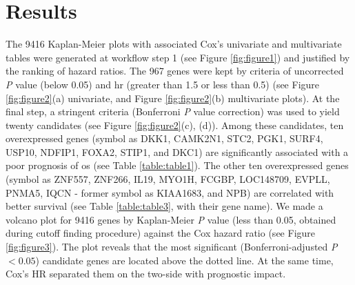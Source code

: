 \documentclass[jpm,article,submit,moreauthors,pdftex]{Definitions/mdpi}
\begin{document}
\clearpage

\section{Results}


The 9416 Kaplan-Meier plots with associated Cox's univariate and multivariate tables were generated at workflow step 1 (see Figure \ref{fig:figure1}) and justified by the ranking of hazard ratios.
The 967 genes were kept by criteria of uncorrected \textit{P} value (below 0.05) and \acrfull{hr} (greater than 1.5 or less than 0.5) (see Figure \ref{fig:figure2}(a) univariate, and Figure \ref{fig:figure2}(b) multivariate plots). 
At the final step, a stringent criteria (Bonferroni \textit{P} value correction) was used to yield twenty candidates (see Figure \ref{fig:figure2}(c), (d)). 
Among these candidates, ten overexpressed genes (symbol as DKK1, CAMK2N1, STC2, PGK1, SURF4, USP10, NDFIP1, FOXA2, STIP1, and DKC1) are significantly associated with a poor prognosis of  \acrshort{os} (see Table \ref{table:table1}). 
The other ten overexpressed genes (symbol as ZNF557, ZNF266, IL19, MYO1H, FCGBP, LOC148709, EVPLL, PNMA5, IQCN - former symbol as KIAA1683, and NPB) are correlated with better survival (see Table \ref{table:table3}, with their gene name).
We made a volcano plot for 9416 genes by Kaplan-Meier \textit{P} value (less than 0.05, obtained during cutoff finding procedure) against the Cox hazard ratio (see Figure \ref{fig:figure3}). The plot reveals that the most significant (Bonferroni-adjusted \textit{P} $< 0.05$) candidate genes are located above the dotted line. At the same time, Cox's HR separated them on the two-side with prognostic impact.
\end{document}
